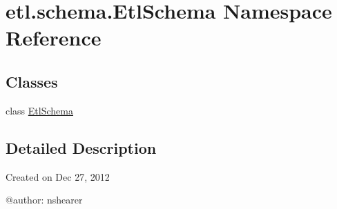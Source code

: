 \hypertarget{namespaceetl_1_1schema_1_1EtlSchema}{\section{etl.\-schema.\-Etl\-Schema Namespace Reference}
\label{namespaceetl_1_1schema_1_1EtlSchema}
}
\subsection*{Classes}
\begin{DoxyCompactItemize}
\item 
class \hyperlink{classetl_1_1schema_1_1EtlSchema_1_1EtlSchema}{Etl\-Schema}
\end{DoxyCompactItemize}


\subsection{Detailed Description}
\begin{DoxyVerb}Created on Dec 27, 2012

@author: nshearer
\end{DoxyVerb}
 